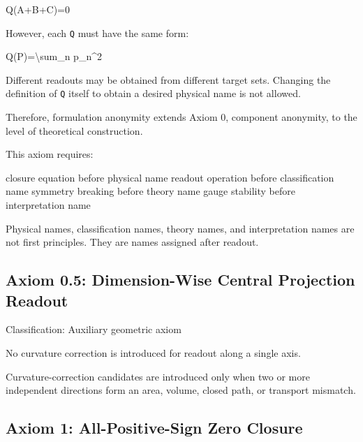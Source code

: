 \documentclass[
  a4paper,
]{article}
\newenvironment{Shaded}{}{}
\newcommand{\NormalTok}[1]{#1}
\begin{document}
\begin{Shaded}
\begin{Highlighting}[]
\NormalTok{Q(A+B+C)=0}
\end{Highlighting}
\end{Shaded}

However, each \texttt{Q} must have the same form:

\begin{Shaded}
\begin{Highlighting}[]
\NormalTok{Q(P)=\textbackslash{}sum\_n p\_n\^{}2}
\end{Highlighting}
\end{Shaded}

Different readouts may be obtained from different target sets. Changing
the definition of \texttt{Q} itself to obtain a desired physical name is
not allowed.

Therefore, formulation anonymity extends Axiom 0, component anonymity,
to the level of theoretical construction.

This axiom requires:

\begin{Shaded}
\begin{Highlighting}[]
\NormalTok{closure equation before physical name}
\NormalTok{readout operation before classification name}
\NormalTok{symmetry breaking before theory name}
\NormalTok{gauge stability before interpretation name}
\end{Highlighting}
\end{Shaded}

Physical names, classification names, theory names, and interpretation
names are not first principles. They are names assigned after readout.

\subsection{Axiom 0.5: Dimension-Wise Central Projection
Readout}\label{axiom-0.5-dimension-wise-central-projection-readout}

Classification: Auxiliary geometric axiom

No curvature correction is introduced for readout along a single axis.

Curvature-correction candidates are introduced only when two or more
independent directions form an area, volume, closed path, or transport
mismatch.

\subsection{Axiom 1: All-Positive-Sign Zero
Closure}\label{axiom-1-all-positive-sign-zero-closure}
\end{document}

